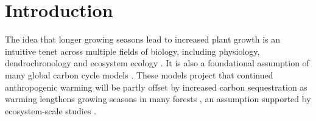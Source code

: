\documentclass[11pt]{article}
\begin{document}
\begin{abstract}
\end{abstract}
\linenumbers
\section*{Introduction} %

The idea that longer growing seasons lead to increased plant growth is an intuitive tenet across multiple fields of biology, including physiology, dendrochronology and ecosystem ecology \citep{nobel1983biophysical,frank2022dendrochronology}. It is also a foundational assumption of many global carbon cycle models \citep[e.g.][]{ito2020global,friedlingstein2022global}. These models project that continued anthropogenic warming will be partly offset by increased carbon sequestration as warming lengthens growing seasons in many forests \citep{friedlingstein2022global}, an assumption supported by ecosystem-scale studies \citep{chen1999effects,keenan2014net,finzi2020}. 
\end{document}
